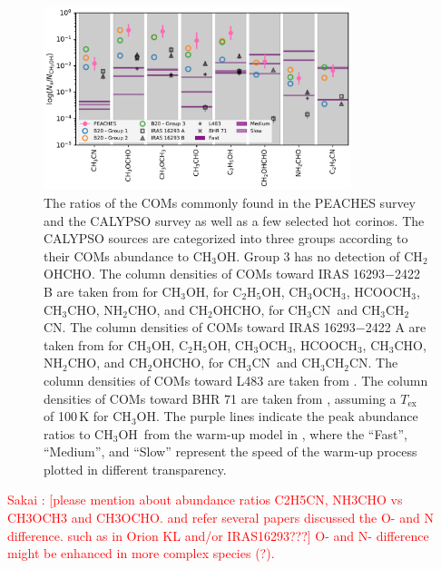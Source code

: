 \documentclass[twocolumn]{aastex62}
\newcommand{\methylformate}{\mbox{HCOOCH$_{3}$}}
\newcommand{\methanol}{\mbox{CH$_{3}$OH}}
\newcommand{\dimethylether}{\mbox{CH$_{3}$OCH$_{3}$}}
\newcommand{\ethanol}{\mbox{C$_{2}$H$_{5}$OH}}
\newcommand{\acetaldehyde}{\mbox{CH$_{3}$CHO}}
\newcommand{\ethylcyanide}{\mbox{CH$_{3}$CH$_{2}$CN}}
\newcommand{\methylcyanide}{\mbox{CH$_{3}$CN}}
\newcommand{\glycolaldehyde}{\mbox{CH$_{2}$OHCHO}}
\newcommand{\formamide}{\mbox{NH$_{2}$CHO}}
\begin{document}
\begin{figure}[htbp!]
  \centering
  \includegraphics[width=0.8\textwidth]{ratios_survey_all.pdf}
  \caption{The ratios of the COMs commonly found in the PEACHES survey and the CALYPSO survey \citep{2020A&A...635A.198B} as well as a few selected hot corinos.  The CALYPSO sources are categorized into three groups according to their COMs abundance to \methanol.  Group 3 has no detection of \glycolaldehyde.  The column densities of COMs toward IRAS 16293$-$2422 B are taken from \citet{2016A&A...595A.117J} for \methanol, \citet{2018A&A...620A.170J} for \ethanol, \dimethylether, \methylformate, \acetaldehyde, \formamide, and \glycolaldehyde, \citet{2018A&A...616A..90C} for \methylcyanide\ and \ethylcyanide.  The column densities of COMs toward IRAS 16293$-$2422 A are taken from \citet{2020A&A...635A..48M} for \methanol, \ethanol, \dimethylether, \methylformate, \acetaldehyde, \formamide, and \glycolaldehyde, \citet{2018A&A...616A..90C} for \methylcyanide\ and \ethylcyanide.  The column densities of COMs toward L483 are taken from \citet{2019A&A...629A..29J}.  The column densities of COMs toward BHR 71 are taken from \citet{2020ApJ...891...61Y}, assuming a $T_\text{ex}$ of 100\,K for \methanol.  The purple lines indicate the peak abundance ratios to \methanol\ from the warm-up model in \citet{2013ApJ...765...60G}, where the ``Fast'', ``Medium'', and ``Slow'' represent the speed of the warm-up process plotted in different transparency.}
  \label{fig:ratios_all}
\end{figure}

\textcolor{red}{Sakai : [please mention about abundance ratios C2H5CN, NH3CHO vs CH3OCH3 and CH3OCHO. and refer several papers discussed the O- and N difference.  such as in Orion KL and/or IRAS16293???] O- and N- difference might be enhanced in more complex species (?).}
\end{document}
